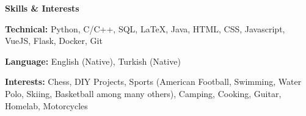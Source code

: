 \documentclass[11pt]{article}
\begin{document}


\begin{center}
    \textbf{Skills \& Interests}
\end{center}

\textbf{Technical:} Python, C/C++, SQL, LaTeX, Java, HTML, CSS, Javascript, VueJS, Flask, Docker, Git

\textbf{Language:} English (Native), Turkish (Native)


\textbf{Interests:} Chess, DIY Projects, Sports (American Football, Swimming, Water Polo, Skiing, Basketball among many others), Camping, Cooking, Guitar, Homelab, Motorcycles
\end{document}
